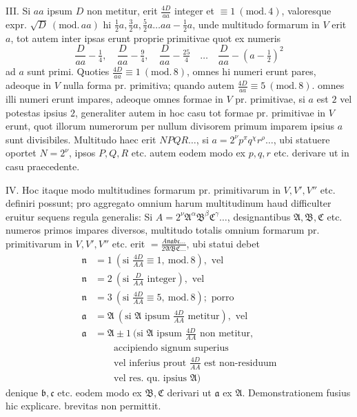 III. Si \(aa\) ipsum \(D\) non metitur, erit \(\frac{4D}{aa}\) integer et \(\equiv1\ (\mathrm{mod.}\,4)\), valoresque expr. \(\surd D\ (\mathrm{mod.}\,aa)\) hi \(\frac12 a,\frac32 a,\frac52 a\ldots aa-\frac12 a\), unde multitudo formarum in \(V\) erit \(a\), tot autem inter ipsas erunt proprie primitivae quot ex numeris
\[
\frac{D}{aa}-\tfrac14,\quad\frac{D}{aa}-\tfrac94,\quad\frac{D}{aa}-\tfrac{25}{4}\quad\ldots\quad\frac{D}{aa}-(a-\tfrac12)^2
\]
ad \(a\) sunt primi. Quoties \(\frac{4D}{aa}\equiv1\ (\mathrm{mod.}\,8)\), omnes hi numeri erunt pares, adeoque in \(V\) nulla forma pr. primitiva; quando autem \(\frac{4D}{aa}\equiv5\ (\mathrm{mod.}\,8)\). omnes illi numeri erunt impares, adeoque omnes formae in \(V\) pr. primitivae, si \(a\) est \(2\) vel potestas ipsius \(2\), generaliter autem in hoc casu tot formae pr. primitivae in \(V\) erunt, quot illorum numerorum per nullum divisorem primum imparem ipsius \(a\) sunt divisibiles. Multitudo haec erit \(NPQR\ldots\), si \(a=2^\nu p^\pi q^\chi r^\rho\ldots\), ubi statuere oportet \(N=2^\nu\), ipsos \(P,Q,R\) etc. autem eodem modo ex \(p,q,r\) etc. derivare ut in casu praecedente.

IV. Hoc itaque modo multitudines formarum pr. primitivarum in \(V,V',V''\) etc. definiri possunt; pro aggregato omnium harum multitudinum haud difficulter eruitur sequens regula generalis: Si \(A=2^\nu\mathfrak{A}^\alpha\mathfrak{B}^\beta\mathfrak{C}^\gamma\ldots\), designantibus \(\mathfrak A,\mathfrak B,\mathfrak C\) etc. numeros primos impares diversos, multitudo totalis omnium formarum pr. primitivarum in \(V,V',V''\) etc. erit \(=\frac{A\mathfrak{nabc}\ldots}{2\mathfrak{ABC}\ldots}\), ubi statui debet
\[
\begin{aligned}
\mathfrak n&=1\ (\text{si }\tfrac{4D}{AA}\equiv1,\ \mathrm{mod.}\,8),\text{ vel}\\
\mathfrak n&=2\ (\text{si }\tfrac{D}{AA}\text{ integer}),\text{ vel}\\
\mathfrak n&=3\ (\text{si }\tfrac{4D}{AA}\equiv5,\ \mathrm{mod.}\,8);\text{ porro}\\
\mathfrak a&=\mathfrak A\ (\text{si }\mathfrak A\text{ ipsum }\tfrac{4D}{AA}\text{ metitur}),\text{ vel}\\
\mathfrak a&=\mathfrak A\pm1\ (\text{si }\mathfrak A\text{ ipsum }\tfrac{4D}{AA}\text{ non metitur,}\\ &\qquad\text{accipiendo signum superius}\\
&\qquad\text{vel inferius prout }\tfrac{4D}{AA}\text{ est non-residuum}\\ &\qquad\text{vel res. qu. ipsius }\mathfrak A)
\end{aligned}
\]
denique \(\mathfrak b,\mathfrak c\) etc. eodem modo ex \(\mathfrak B,\mathfrak C\) derivari ut \(\mathfrak a\) ex \(\mathfrak A\). Demonstrationem fusius hic explicare. brevitas non permittit.

